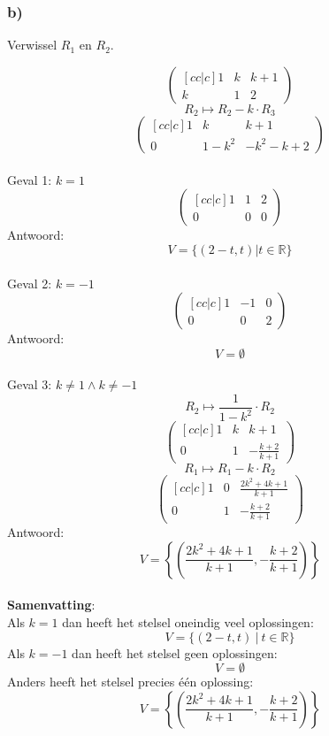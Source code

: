 \documentclass[lineaire_algebra_oplossingen.tex]{subfiles}
\begin{document}
\subsubsection*{b)}
\begin{center}
Verwissel $R_1$ en $R_2$.
\end{center}
\[
\begin{pmatrix}[cc|c]
1 &  k &  k+1\\
k &  1 &  2
\end{pmatrix}
\]
\[ R_2 \longmapsto R_2 - k\cdot R_3\]
\[
\begin{pmatrix}[cc|c]
1 &  k &  k+1\\
0 &  1-k^2 &  -k^2-k+2
\end{pmatrix}
\]\\
Geval 1: $k=1$\\
\[
\begin{pmatrix}[cc|c]
1 &  1 &  2\\
0 &  0 &  0
\end{pmatrix}
\]
Antwoord:
\[
V=\{(2-t,t) | t \in \mathbb{R}\}
\]\\
Geval 2: $k=-1$\\
\[
\begin{pmatrix}[cc|c]
1 & -1 &  0\\
0 &  0 &  2
\end{pmatrix}
\]
Antwoord:
\[
V=\emptyset
\]\\
Geval 3: $k\neq 1 \wedge k\neq -1$\\
\[ R_2 \longmapsto \frac{1}{1-k^2}\cdot R_2 \]
\[
\begin{pmatrix}[cc|c]
1 &  k &  k+1\\
0 &  1 &  -\frac{k+2}{k+1}
\end{pmatrix}
\]
\[ R_1 \longmapsto R_1-k\cdot R_2 \]
\[
\begin{pmatrix}[cc|c]
1 &  0 &  \frac{2k^2+4k+1}{k+1}\\
0 &  1 &  -\frac{k+2}{k+1}
\end{pmatrix}
\]
Antwoord:
\[
V=\left\lbrace\left(\frac{2k^2+4k+1}{k+1},-\frac{k+2}{k+1}\right)\right\rbrace
\]\\
\textbf{Samenvatting}:\\
Als $k=1$ dan heeft het stelsel oneindig veel oplossingen:
\[
V=\{(2-t,t)\ |\ t \in \mathbb{R}\}
\]
Als $k=-1$ dan heeft het stelsel geen oplossingen:
\[
V=\emptyset
\]
Anders heeft het stelsel precies \'e\'en oplossing:
\[
V=\left\lbrace\left(\frac{2k^2+4k+1}{k+1},-\frac{k+2}{k+1}\right)\right\rbrace
\]
\end{document}
